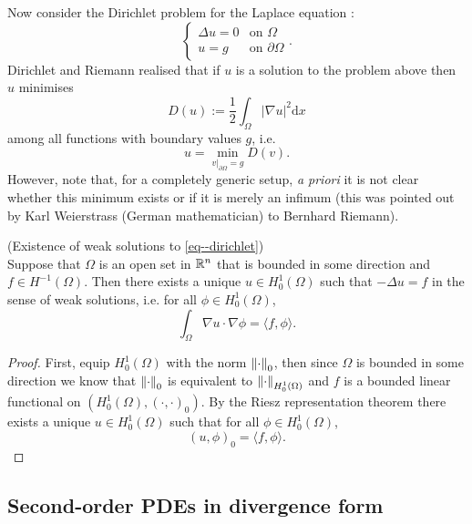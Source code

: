 \documentclass[11pt]{article}
\begin{document}
			Now consider the Dirichlet problem for the Laplace equation :
			\begin{equation*}
				\begin{cases}
					\Delta u=0 & \text{on }\Omega\\
					u=g & \text{on }\partial\Omega
				\end{cases}.
			\end{equation*}
			Dirichlet and Riemann realised that if $u$ is a solution to the problem above then $u$ minimises
			\begin{equation*}
				D(u):=\frac{1}{2}\int_\Omega|\nabla u|^2\mathrm{d}x
			\end{equation*}
			among all functions with boundary values $g$, i.e.
			\begin{equation*}
				u=\min_{v|_{\partial\Omega}=g}D(v).
			\end{equation*}
			However, note that, for a completely generic setup, \textit{a priori} it is not clear whether this minimum exists or if it is merely an infimum (this was pointed out by Karl Weierstrass (German mathematician) to Bernhard Riemann). 

			\begin{thm}(Existence of weak solutions to \eqref{eq--dirichlet})\\
				Suppose that $\Omega$ is an open set in $\mathbb{R}^n$ that is bounded in some direction and $f\in H^{-1}(\Omega)$. Then there exists a unique $u\in H^1_0(\Omega)$ such that $-\Delta u=f$ in the sense of weak solutions, i.e. for all $\phi\in H^1_0(\Omega)$,
				\begin{equation*}
					\int_\Omega\nabla u\cdot\nabla\phi=\langle f,\phi\rangle.
				\end{equation*}
			\end{thm}
			\begin{proof}
				First, equip $H^1_0(\Omega)$ with the norm $\norm{\cdot}_0$, then since $\Omega$ is bounded in some direction we know that $\norm{\cdot}_0$ is equivalent to $\norm{\cdot}_{H^1_0(\Omega)}$ and $f$ is a bounded linear functional on $(H^1_0(\Omega),(\cdot,\cdot)_0)$. By the Riesz representation theorem there exists a unique $u\in H^1_0(\Omega)$ such that for all $\phi\in H^1_0(\Omega)$,
				\begin{equation*}
					(u,\phi)_0=\langle f,\phi\rangle.
				\end{equation*}
			\end{proof}


		\subsection{Second-order PDEs in divergence form}
\end{document}
